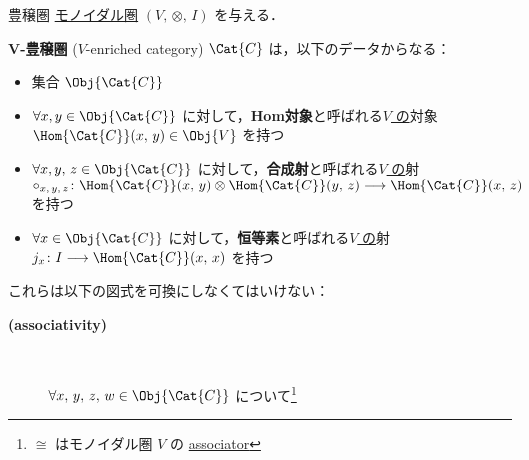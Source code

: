 \documentclass[TQFT_main]{subfiles}
\begin{document}
\begin{mydef}[label=redef:enriched,breakable]{豊穣圏}
    \hyperref[redef:monoidal-category]{モノイダル圏} $(V,\, \otimes,\, I)$ を与える．

    $\bm{V}$\textbf{-豊穣圏} ($V$-enriched category) $\Cat{C}$ は，以下のデータからなる：
    \begin{itemize}
        \item 集合 $\Obj{\Cat{C}}$
        \item $\forall x, y \in \Obj{\Cat{C}}$ に対して，\textbf{Hom対象}と呼ばれる\underline{$V$ の}対象 $\Hom{\Cat{C}}(x,\, y) \in \Obj{V}$ を持つ
        \item $\forall x, y,\, z \in \Obj{\Cat{C}}$ に対して，\textbf{合成射}と呼ばれる\underline{$V$ の}射 $\circ_{x,\, y,\, z} \colon \Hom{\Cat{C}}(x,\, y) \otimes \Hom{\Cat{C}}(y,\, z) \lto \Hom{\Cat{C}} (x,\, z)$ を持つ
        \item $\forall x \in \Obj{\Cat{C}}$ に対して，\textbf{恒等素}と呼ばれる\underline{$V$ の}射 $j_x \colon I \lto \Hom{\Cat{C}} (x,\, x)$ を持つ
    \end{itemize}
    これらは以下の図式を可換にしなくてはいけない：
    \begin{description}
        \item[\textbf{(associativity)}]　
        
        $\forall x,\, y,\, z,\, w \in \Obj{\Cat{C}}$ について\footnote{$\cong$ はモノイダル圏 $V$ の \hyperref[def:monoidal-category]{associator}}
        \begin{flushleft}
        \end{flushleft}
        

\end{description}
\end{mydef}
\end{document}

